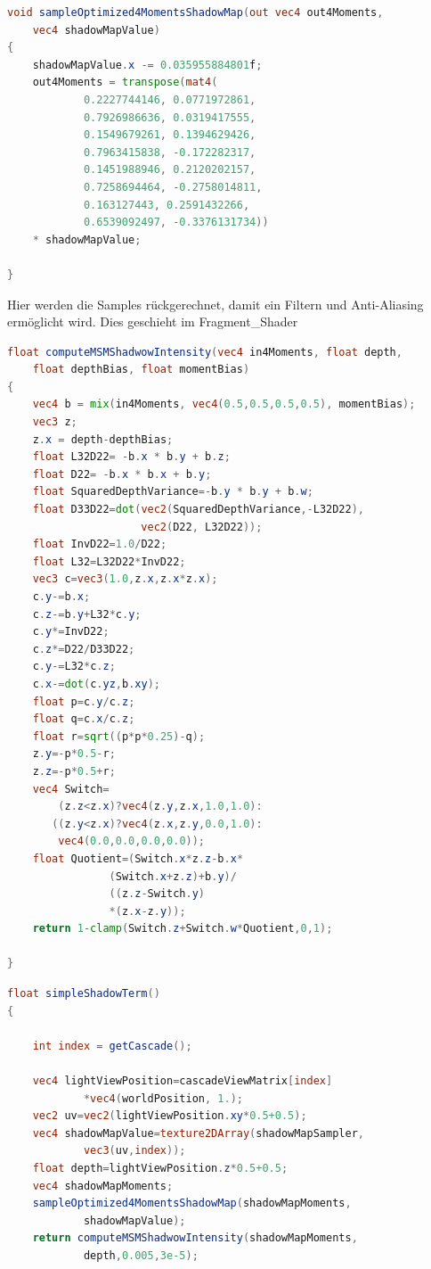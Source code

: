 \documentclass[runningheaders,a4paper]{llncs}
\begin{document}
\begin{lstlisting}[language=GLSL]
void sampleOptimized4MomentsShadowMap(out vec4 out4Moments, 
	vec4 shadowMapValue)
{
    shadowMapValue.x -= 0.035955884801f;
    out4Moments = transpose(mat4(     			
    		0.2227744146, 0.0771972861,
    		0.7926986636, 0.0319417555,
     		0.1549679261, 0.1394629426,
     		0.7963415838, -0.172282317,
     		0.1451988946, 0.2120202157,
     		0.7258694464, -0.2758014811,
     		0.163127443, 0.2591432266,
     		0.6539092497, -0.3376131734))
    * shadowMapValue;

}
\end{lstlisting}
Hier werden die Samples rückgerechnet, damit ein Filtern und Anti-Aliasing ermöglicht wird.
Dies geschieht im Fragment\_Shader
\begin{lstlisting}[language=GLSL]
float computeMSMShadwowIntensity(vec4 in4Moments, float depth, 
	float depthBias, float momentBias)
{
    vec4 b = mix(in4Moments, vec4(0.5,0.5,0.5,0.5), momentBias);
    vec3 z;
    z.x = depth-depthBias;
    float L32D22= -b.x * b.y + b.z;
    float D22= -b.x * b.x + b.y;
    float SquaredDepthVariance=-b.y * b.y + b.w;
    float D33D22=dot(vec2(SquaredDepthVariance,-L32D22),
                     vec2(D22, L32D22));
    float InvD22=1.0/D22;
    float L32=L32D22*InvD22;
    vec3 c=vec3(1.0,z.x,z.x*z.x);
    c.y-=b.x;
    c.z-=b.y+L32*c.y;
    c.y*=InvD22;
    c.z*=D22/D33D22;
    c.y-=L32*c.z;
    c.x-=dot(c.yz,b.xy);
    float p=c.y/c.z;
    float q=c.x/c.z;
    float r=sqrt((p*p*0.25)-q);
    z.y=-p*0.5-r;
    z.z=-p*0.5+r;
    vec4 Switch=
        (z.z<z.x)?vec4(z.y,z.x,1.0,1.0):
       ((z.y<z.x)?vec4(z.x,z.y,0.0,1.0):
        vec4(0.0,0.0,0.0,0.0));
    float Quotient=(Switch.x*z.z-b.x*
    			(Switch.x+z.z)+b.y)/
    			((z.z-Switch.y)
    			*(z.x-z.y));
    return 1-clamp(Switch.z+Switch.w*Quotient,0,1);
    
}
\end{lstlisting}
\begin{lstlisting}[language=GLSL]
float simpleShadowTerm()
{
    
    int index = getCascade();

    vec4 lightViewPosition=cascadeViewMatrix[index]
    		*vec4(worldPosition, 1.);
    vec2 uv=vec2(lightViewPosition.xy*0.5+0.5);
    vec4 shadowMapValue=texture2DArray(shadowMapSampler, 
    		vec3(uv,index));
    float depth=lightViewPosition.z*0.5+0.5;
    vec4 shadowMapMoments;
    sampleOptimized4MomentsShadowMap(shadowMapMoments,
    		shadowMapValue);
    return computeMSMShadwowIntensity(shadowMapMoments,
    		depth,0.005,3e-5);
\end{lstlisting}
\end{document}
